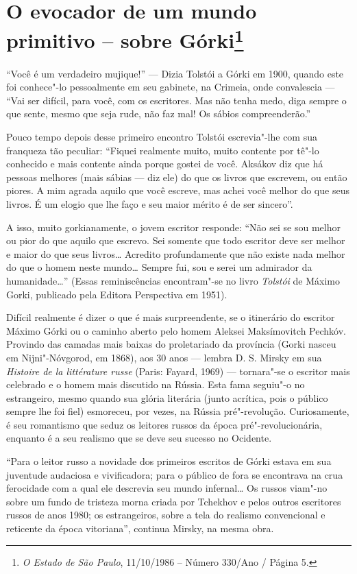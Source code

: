 \chapter{O evocador de um mundo primitivo -- sobre Górki\footnote{\emph{O
  Estado de São Paulo}, 11/10/1986 -- Número 330/Ano / Página 5.}}

``Você é um verdadeiro mujique!'' --- Dizia Tolstói a Górki em 1900,
quando este foi conhece"-lo pessoalmente em seu gabinete, na Crimeia, onde convalescia --- ``Vai ser
difícil, para você, com os escritores. Mas não tenha medo, diga sempre o
que sente, mesmo que seja rude, não faz mal! Os sábios compreenderão.''

Pouco tempo depois desse primeiro encontro Tolstói escrevia"-lhe com sua
franqueza tão peculiar: ``Fiquei realmente muito, muito contente por
tê"-lo conhecido e mais contente ainda porque gostei de você. Aksákov diz
que há pessoas melhores (mais sábias --- diz ele) do que os livros que
escrevem, ou então piores. A mim agrada aquilo que você escreve, mas
achei você melhor do que seus livros. É um elogio que lhe faço e seu
maior mérito é de ser sincero''.

A isso, muito gorkianamente, o jovem escritor responde: ``Não sei se sou
melhor ou pior do que aquilo que escrevo. Sei somente que todo escritor
deve ser melhor e maior do que seus livros\ldots{} Acredito profundamente que
não existe nada melhor do que o homem neste mundo\ldots{} Sempre fui, sou e
serei um admirador da humanidade\ldots{}'' (Essas reminiscências
encontram"-se no livro \emph{Tolstói} de Máximo Gorki, publicado pela
Editora Perspectiva em 1951).

Difícil realmente é dizer o que é mais surpreendente, se o itinerário do
escritor Máximo Górki ou o caminho aberto pelo homem Aleksei
Maksímovitch Pechkóv. Provindo das camadas mais baixas do proletariado
da província (Gorki nasceu em Nijni"-Nóvgorod, em 1868), aos 30 anos --- lembra
D. S. Mirsky em sua \emph{Histoire de la littérature russe} (Paris: Fayard, 1969) --- tornara"-se o
escritor mais celebrado e o homem mais discutido na Rússia. Esta fama
seguiu"-o no estrangeiro, mesmo quando sua glória literária (junto
acrítica, pois o público sempre lhe foi fiel) esmoreceu, por vezes, na
Rússia pré"-revolução. Curiosamente, é seu romantismo que seduz os
leitores russos da época pré"-revolucionária, enquanto é a seu realismo
que se deve seu sucesso no Ocidente.

``Para o leitor russo a novidade dos primeiros escritos de Górki estava
em sua juventude audaciosa e vivificadora; para o público de fora se
encontrava na crua ferocidade com a qual ele descrevia seu mundo
infernal\ldots{} Os russos viam"-no sobre um fundo de tristeza morna criada
por Tchekhov e pelos outros escritores russos de anos 1980; os
estrangeiros, sobre a tela do realismo convencional e reticente da época
vitoriana'', continua Mirsky, na mesma obra.

